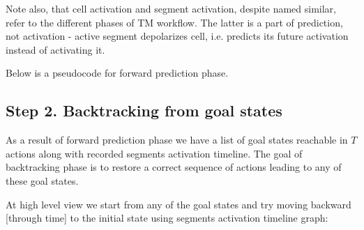 \documentclass[a4paper]{article}
\begin{document}

Note also, that cell activation and segment activation, despite named similar, refer to the different phases of TM workflow. The latter is a part of prediction, not activation - active segment depolarizes cell, i.e. predicts its future activation instead of activating it.

Below is a pseudocode for forward prediction phase.







\subsection{Step 2. Backtracking from goal states}

As a result of forward prediction phase we have a list of goal states reachable in $T$ actions along with recorded segments activation timeline. The goal of backtracking phase is to restore a correct sequence of actions leading to any of these goal states.

At high level view we start from any of the goal states and try moving backward [through time] to the initial state using segments activation timeline graph:

\end{document}
